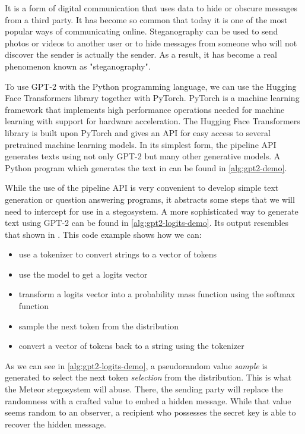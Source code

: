 \begin{example}
It is a form of digital communication that uses data to hide or obscure messages from a third party. It has become so common that today it is one of the most popular ways of communicating online. Steganography can be used to send photos or videos to another user or to hide messages from someone who will not discover the sender is actually the sender. As a result, it has become a real phenomenon known as "steganography".
  \label{example:gpt2-output-sample}
\end{example}

To use GPT-2 with the Python programming language, we can use the Hugging Face Transformers library together with PyTorch.
PyTorch \cite{PyTorch} is a machine learning framework that implements high performance operations needed for machine learning with support for hardware acceleration.
The Hugging Face Transformers library \cite{HFTransformers} is built upon PyTorch and gives an API for easy access to several pretrained machine learning models.
In its simplest form, the pipeline API generates texts using not only GPT-2 but many other generative models.
A Python program which generates the text in  can be found in \autoref{alg:gpt2-demo}.

While the use of the pipeline API is very convenient to develop simple text generation or question answering programs, it abstracts some steps that we will need to intercept for use in a stegosystem.
A more sophisticated way to generate text using GPT-2 can be found in \autoref{alg:gpt2-logits-demo}.
Its output resembles that shown in . 
This code example shows how we can:

\begin{itemize}
  \item use a tokenizer to convert strings to a vector of tokens
  \item use the model to get a logits vector
  \item transform a logits vector into a probability mass function using the softmax function
  \item sample the next token from the distribution
  \item convert a vector of tokens back to a string using the tokenizer
\end{itemize}

As we can see in \autoref{alg:gpt2-logits-demo}, a pseudorandom value \emph{sample} is generated to select the next token \emph{selection} from the distribution.
This is what the Meteor stegosystem will abuse.
There, the sending party will replace the randomness with a crafted value to embed a hidden message.
While that value seems random to an observer, a recipient who possesses the secret key is able to recover the hidden message.



